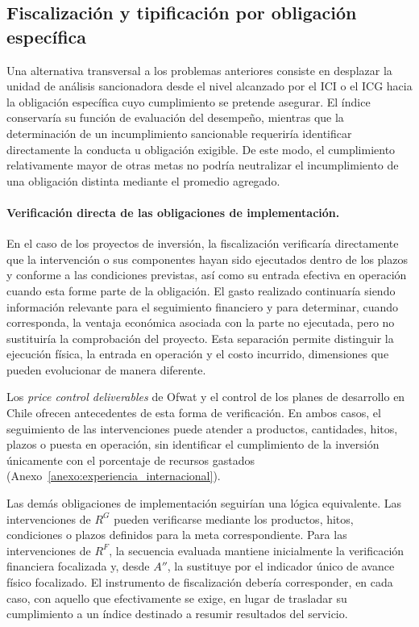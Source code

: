 \subsection{Fiscalización y tipificación por obligación específica}

Una alternativa transversal a los problemas anteriores consiste en desplazar la unidad de análisis sancionadora desde el nivel alcanzado por el ICI o el ICG hacia la obligación específica cuyo cumplimiento se pretende asegurar. El índice conservaría su función de evaluación del desempeño, mientras que la determinación de un incumplimiento sancionable requeriría identificar directamente la conducta u obligación exigible. De este modo, el cumplimiento relativamente mayor de otras metas no podría neutralizar el incumplimiento de una obligación distinta mediante el promedio agregado.

\paragraph{Verificación directa de las obligaciones de implementación.}

En el caso de los proyectos de inversión, la fiscalización verificaría directamente que la intervención o sus componentes hayan sido ejecutados dentro de los plazos y conforme a las condiciones previstas, así como su entrada efectiva en operación cuando esta forme parte de la obligación. El gasto realizado continuaría siendo información relevante para el seguimiento financiero y para determinar, cuando corresponda, la ventaja económica asociada con la parte no ejecutada, pero no sustituiría la comprobación del proyecto. Esta separación permite distinguir la ejecución física, la entrada en operación y el costo incurrido, dimensiones que pueden evolucionar de manera diferente.

Los \emph{price control deliverables} de Ofwat y el control de los planes de desarrollo en Chile ofrecen antecedentes de esta forma de verificación. En ambos casos, el seguimiento de las intervenciones puede atender a productos, cantidades, hitos, plazos o puesta en operación, sin identificar el cumplimiento de la inversión únicamente con el porcentaje de recursos gastados (Anexo~\ref{anexo:experiencia_internacional}).

Las demás obligaciones de implementación seguirían una lógica equivalente. Las intervenciones de \(R^{G}\) pueden verificarse mediante los productos, hitos, condiciones o plazos definidos para la meta correspondiente. Para las intervenciones de \(R^{F}\), la secuencia evaluada mantiene inicialmente la verificación financiera focalizada y, desde \(A''\), la sustituye por el indicador único de avance físico focalizado. El instrumento de fiscalización debería corresponder, en cada caso, con aquello que efectivamente se exige, en lugar de trasladar su cumplimiento a un índice destinado a resumir resultados del servicio.


